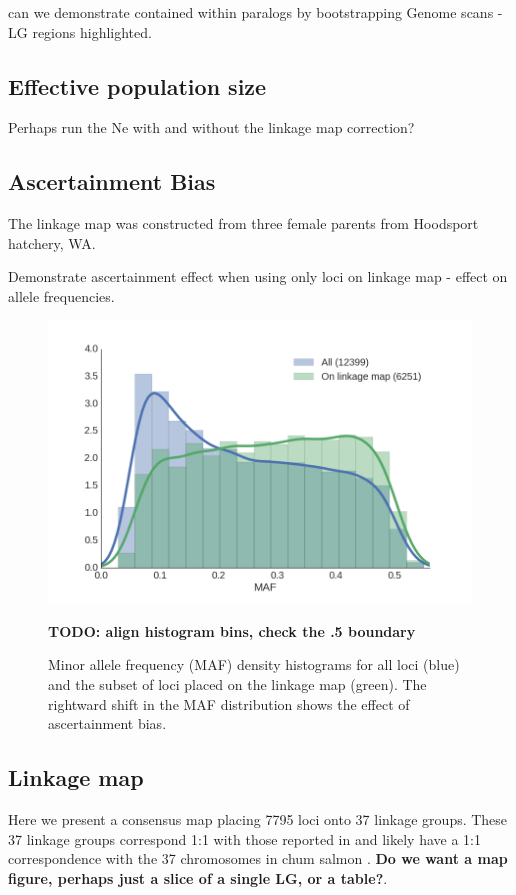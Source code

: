 \documentclass[12pt, one column]{article}
\begin{document}
can we demonstrate contained within paralogs by bootstrapping 
Genome scans - LG regions highlighted.

\subsection*{Effective population size}


Perhaps run the Ne with and without the linkage map correction?

\subsection*{Ascertainment Bias}
The linkage map was constructed from three female parents from Hoodsport hatchery, WA.

Demonstrate ascertainment effect when using only loci on linkage map - effect on allele frequencies.

\begin{figure}[H]
\includegraphics[scale=.3]{figures/supplemental/ascertainment2.png}
\caption{Minor allele frequency (MAF) density histograms for all loci (blue) and the subset of loci placed on the linkage map (green). The rightward shift in the MAF distribution shows the effect of ascertainment bias.} \textbf{TODO: align histogram bins, check the .5 boundary}
\end{figure}

\subsection*{Linkage map}
Here we present a consensus map placing 7795 loci onto 37 linkage groups.  These 37 linkage groups correspond 1:1 with those reported in \citep{Waples2015} and likely have a 1:1 correspondence with the 37 chromosomes in chum salmon \citep{Phillips2001}. \textbf{Do we want a map figure, perhaps just a slice of a single LG, or a table?}.
\end{document}
